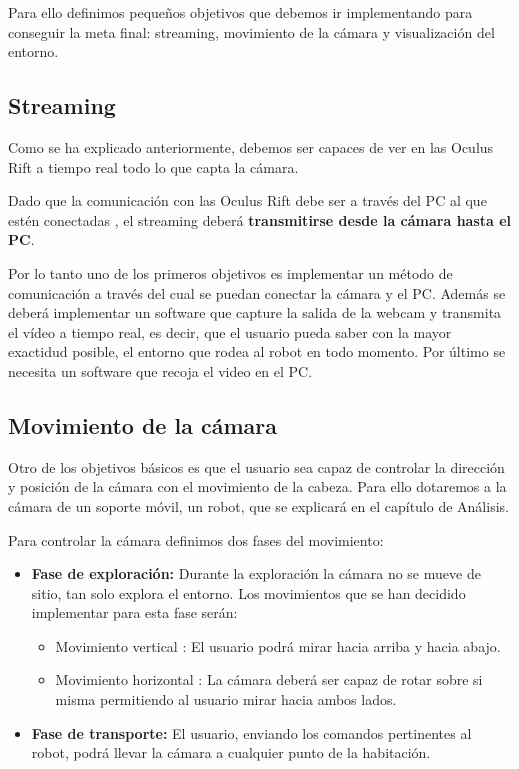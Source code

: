 \documentclass[twoside, 11pt]{epstfg}
\begin{document}
Para ello definimos pequeños objetivos que debemos ir implementando para conseguir la meta final: streaming, movimiento de la cámara y visualización del entorno.

\subsection{Streaming}
Como se ha explicado anteriormente, debemos ser capaces de ver en las Oculus Rift a tiempo real todo lo que capta la cámara.

Dado que la comunicación con las Oculus Rift debe ser a través del PC al que estén conectadas , el streaming deberá \textbf{transmitirse desde la cámara hasta el PC}.

Por lo tanto uno de los primeros objetivos es implementar un método de comunicación a través del cual se puedan conectar  la cámara y el PC. Además se deberá implementar un software que capture la salida de la webcam y transmita el vídeo a tiempo real, es decir, que el usuario pueda saber con la mayor exactidud posible, el entorno que rodea al robot en todo momento. Por último se necesita un software que recoja el video en el PC.

\subsection{Movimiento de la cámara}
Otro de los objetivos básicos es que el usuario sea capaz de controlar la dirección y posición de la cámara con el movimiento de la cabeza. Para ello dotaremos a la cámara de un soporte móvil, un robot, que se explicará en el capítulo de Análisis.

Para controlar la cámara definimos dos fases del movimiento:
\begin{itemize}
	\item \textbf{Fase de exploración:}
	Durante la exploración la cámara no se mueve de sitio, tan solo explora el entorno.
	Los movimientos que se han decidido implementar para esta fase serán:
	\begin{itemize}
		\item Movimiento vertical : El usuario podrá mirar hacia arriba y hacia abajo.
		\item Movimiento horizontal : La cámara deberá ser capaz de rotar sobre si misma permitiendo al usuario mirar hacia ambos lados.
	\end{itemize}
	\item \textbf{Fase de transporte:}
	El usuario, enviando los comandos pertinentes al robot, podrá llevar la cámara a cualquier punto de la habitación.
	
\end{itemize}
\end{document}
